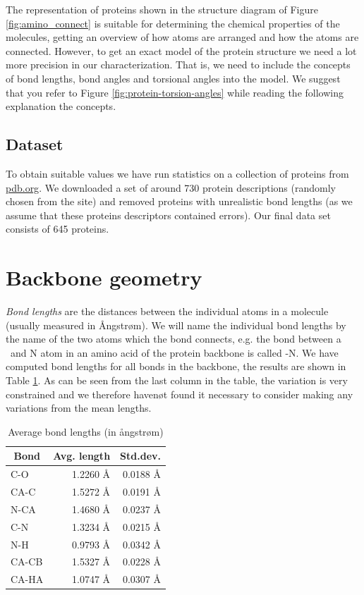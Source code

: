 The representation of proteins shown in the structure diagram of
Figure \ref{fig:amino_connect} is suitable for determining the
chemical properties of the molecules, getting an overview of how atoms
are arranged and how the atoms are connected. However, to get an exact
model of the protein structure we need a lot more precision in our
characterization. That is, we need to include the concepts of bond
lengths, bond angles and torsional angles into the model.  We suggest
that you refer to Figure \ref{fig:protein-torsion-angles} while
reading the following explanation the concepts.

\subsection{Dataset}
To obtain suitable values we have run statistics on a collection of
proteins from \url{pdb.org}. We downloaded a set of around 730 protein
descriptions (randomly chosen from the site) and removed proteins with
unrealistic bond lengths (as we assume that these proteins descriptors
contained errors). Our final data set consists of 645 proteins.


\section{Backbone geometry}
\textit{Bond lengths} are the distances between the individual atoms
in a molecule (usually measured in Ångstrøm). We will name the
individual bond lengths by the name of the two atoms which the bond
connects, e.g. the bond between a \Ca\ and N atom in an amino acid of
the protein backbone is called \Ca -N. We have computed bond lengths
for all bonds in the backbone, the results are shown in Table
\ref{tab:average_bond_lengths}. As can be seen from the last column in
the table, the variation is very constrained and we therefore havenøt
found it necessary to consider making any variations from the mean
lengths. 

\begin{table}
  \centering
  \begin{tabular}{lrr}
    \toprule
    \multicolumn{1}{c}{Bond} & \multicolumn{1}{c}{Avg. length} & \multicolumn{1}{c}{Std.dev.} \\ \midrule 
    C-O   & 1.2260 Å & 0.0188 Å\\
    CA-C  & 1.5272 Å & 0.0191 Å\\
    N-CA  & 1.4680 Å & 0.0237 Å\\
    C-N   & 1.3234 Å & 0.0215 Å\\
    N-H   & 0.9793 Å & 0.0342 Å\\
    CA-CB & 1.5327 Å & 0.0228 Å\\
    CA-HA & 1.0747 Å & 0.0307 Å\\ \bottomrule
  \end{tabular}
  \vspace{1mm}
  \caption{Average bond lengths (in ångstrøm)}
  \label{tab:average_bond_lengths}
\end{table}

